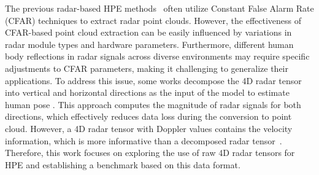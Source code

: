 The previous radar-based HPE methods~\cite{xue2021mmmesh,sengupta2020mm,endo2023multi} often utilize Constant False Alarm Rate (CFAR) techniques \cite{de2007design,cruw3d,wang2021rodnet} to extract radar point clouds. However, the effectiveness of CFAR-based point cloud extraction can be easily influenced by variations in radar module types and hardware parameters. Furthermore, different human body reflections in radar signals across diverse environments may require specific adjustments to CFAR parameters, making it challenging to generalize their applications. 
To address this issue, some works decompose the 4D radar tensor into vertical and horizontal directions as the input of the model to estimate human pose \cite{lee2023hupr,xie2023rpm,yu2023mobirfpose}. This approach computes the magnitude of radar signals for both directions, which effectively reduces data loss during the conversion to point cloud. However, a 4D radar tensor with Doppler values contains the velocity information, which is more informative than a decomposed radar tensor~\cite{paek2022k, cheng2023centerradarnet}. Therefore, this work focuses on exploring the use of raw 4D radar tensors for HPE and establishing a benchmark based on this data format. 

